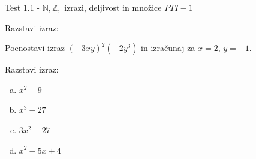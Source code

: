 \documentclass[a4paper,12pt]{letter}
\renewcommand{\headrulewidth}{3pt}
\renewcommand{\headrulewidth}{0.3pt}
\newcounter{tocke}
\begin{document}
\pagestyle{fancy}
\renewcommand\headrulewidth{0pt}
\lhead{}\chead{}\rhead{}
\rfoot{\vspace*{-2\baselineskip}}
\renewcommand{\vec}{\overrightarrow}
\def\programletnik{$PTI-1$}
\def\naslov{Test 1.1 - }
\def\sklop{$\mathbb{N},\mathbb{Z},$ izrazi, deljivost in mno\v{z}ice}
\def\tockeA{2+3+3+2}
\def\tockeB{5}
\def\tockeC{2+4+2+3}
\def\tockeD{6}
\def\tockeE{4}
\def\tockeM{4}

\begin{minipage}{20cm}
\begin{bclogo}[couleur=brown!30,
  arrondi=0,ombre=true, couleurOmbre=gray!50,
logo =\bcplume,
  noborder=true]
{\textrm{{\Large{\naslov \sklop} \Huge{}
\large{} \hfill \programletnik}}}
\end{bclogo}
\end{minipage}
\begin{minipage}{20cm}
\begin{bclogo}[couleur=brown!30,
  arrondi=0,ombre=true, couleurOmbre=gray!50,
logo =\bcplume,
  noborder=true]
{\textrm{{}}}
\end{bclogo}
\end{minipage}

\begin{naloga}[\hfill $\tockeM$] \addtocounter{tocke}{\numexpr\tockeM\relax}
Razstavi izraz:
\begin{enumerate}[a)]
Poenostavi izraz $(-3xy)^2(-2y^3)$ in izračunaj za $x=2$, $y=-1.$
\end{enumerate}

\end{naloga}
\vspace{5cm}

\begin{naloga}[\hfill $\tockeA$] \addtocounter{tocke}{\numexpr\tockeA\relax}
Razstavi izraz:
\begin{enumerate}[a)]
\item $x^2-9$
\item $x^3-27$
\item  $3x^2-27$
\item  $x^2-5x+4$
\end{enumerate}

\end{naloga}
\newpage
\end{document}

